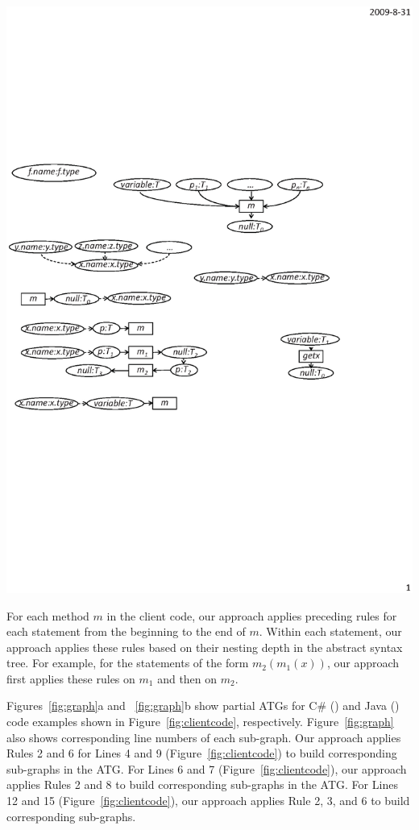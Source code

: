 \begin{enumerate}
\begin{center}
\includegraphics[scale=0.7,clip]{figure/rule9.eps}%
\end{center}

\end{enumerate}

For each method $m$ in the client code, our approach applies preceding
rules for each statement from the beginning to the end of $m$. 
Within each statement, our approach applies these rules based on
their nesting depth in the abstract syntax tree. For example,
for the statements of the form $m_2(m_1(x))$, our approach first applies
these rules on $m_1$ and then on $m_2$.

Figures~\ref{fig:graph}a and ~\ref{fig:graph}b show partial ATGs for 
C\# () and Java () 
code examples shown in Figure~\ref{fig:clientcode}, respectively.
Figure~\ref{fig:graph} also shows corresponding line numbers of each
sub-graph. Our approach applies Rules 2 and 6 for Lines 4 and 9 (Figure~\ref{fig:clientcode}) 
to build corresponding sub-graphs in the ATG. For
Lines 6 and 7 (Figure~\ref{fig:clientcode}), our approach applies Rules 2 and 8 to build
corresponding sub-graphs in the ATG. For Lines 12 and 15 (Figure~\ref{fig:clientcode}), 
our approach applies Rule 2, 3, and 6 to build corresponding sub-graphs.

